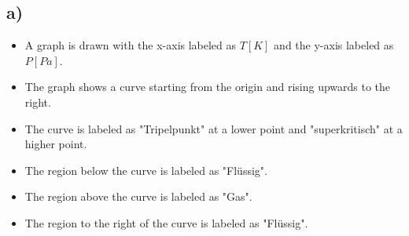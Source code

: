 

\subsection*{a)}

\begin{itemize}
    \item A graph is drawn with the x-axis labeled as $T [K]$ and the y-axis labeled as $P [Pa]$.
    \item The graph shows a curve starting from the origin and rising upwards to the right.
    \item The curve is labeled as "Tripelpunkt" at a lower point and "superkritisch" at a higher point.
    \item The region below the curve is labeled as "Flüssig".
    \item The region above the curve is labeled as "Gas".
    \item The region to the right of the curve is labeled as "Flüssig".
\end{itemize}